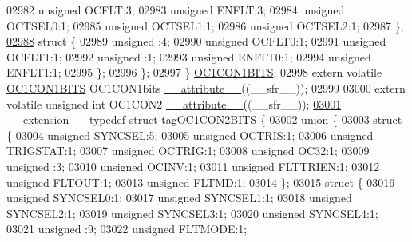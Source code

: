 \begin{DoxyCode}
02982       \textcolor{keywordtype}{unsigned} OCFLT:3;
02983       \textcolor{keywordtype}{unsigned} ENFLT:3;
02984       \textcolor{keywordtype}{unsigned} OCTSEL0:1;
02985       \textcolor{keywordtype}{unsigned} OCTSEL1:1;
02986       \textcolor{keywordtype}{unsigned} OCTSEL2:1;
02987     \};
\hypertarget{a00009_source_l02988}{}\hyperlink{a00009}{02988}     \textcolor{keyword}{struct }\{
02989       \textcolor{keywordtype}{unsigned} :4;
02990       \textcolor{keywordtype}{unsigned} OCFLT0:1;
02991       \textcolor{keywordtype}{unsigned} OCFLT1:1;
02992       \textcolor{keywordtype}{unsigned} :1;
02993       \textcolor{keywordtype}{unsigned} ENFLT0:1;
02994       \textcolor{keywordtype}{unsigned} ENFLT1:1;
02995     \};
02996   \};
02997 \} \hyperlink{a00008_d8/d00/a00606}{OC1CON1BITS};
02998 \textcolor{keyword}{extern} \textcolor{keyword}{volatile} \hyperlink{a00008_d8/d00/a00606}{OC1CON1BITS} OC1CON1bits \hyperlink{a00009_a493c46f03454991ccc5aa7a6e1dfb2a7}{\_\_attribute\_\_}((\_\_sfr\_\_));
02999 
03000 \textcolor{keyword}{extern} \textcolor{keyword}{volatile} \textcolor{keywordtype}{unsigned} \textcolor{keywordtype}{int}  OC1CON2 \hyperlink{a00009_a493c46f03454991ccc5aa7a6e1dfb2a7}{\_\_attribute\_\_}((\_\_sfr\_\_));
\hypertarget{a00009_source_l03001}{}\hyperlink{a00008}{03001} \_\_extension\_\_ \textcolor{keyword}{typedef} \textcolor{keyword}{struct }tagOC1CON2BITS \{
\hypertarget{a00009_source_l03002}{}\hyperlink{a00009}{03002}   \textcolor{keyword}{union }\{
\hypertarget{a00009_source_l03003}{}\hyperlink{a00009}{03003}     \textcolor{keyword}{struct }\{
03004       \textcolor{keywordtype}{unsigned} SYNCSEL:5;
03005       \textcolor{keywordtype}{unsigned} OCTRIS:1;
03006       \textcolor{keywordtype}{unsigned} TRIGSTAT:1;
03007       \textcolor{keywordtype}{unsigned} OCTRIG:1;
03008       \textcolor{keywordtype}{unsigned} OC32:1;
03009       \textcolor{keywordtype}{unsigned} :3;
03010       \textcolor{keywordtype}{unsigned} OCINV:1;
03011       \textcolor{keywordtype}{unsigned} FLTTRIEN:1;
03012       \textcolor{keywordtype}{unsigned} FLTOUT:1;
03013       \textcolor{keywordtype}{unsigned} FLTMD:1;
03014     \};
\hypertarget{a00009_source_l03015}{}\hyperlink{a00009}{03015}     \textcolor{keyword}{struct }\{
03016       \textcolor{keywordtype}{unsigned} SYNCSEL0:1;
03017       \textcolor{keywordtype}{unsigned} SYNCSEL1:1;
03018       \textcolor{keywordtype}{unsigned} SYNCSEL2:1;
03019       \textcolor{keywordtype}{unsigned} SYNCSEL3:1;
03020       \textcolor{keywordtype}{unsigned} SYNCSEL4:1;
03021       \textcolor{keywordtype}{unsigned} :9;
03022       \textcolor{keywordtype}{unsigned} FLTMODE:1;

\end{DoxyCode}
